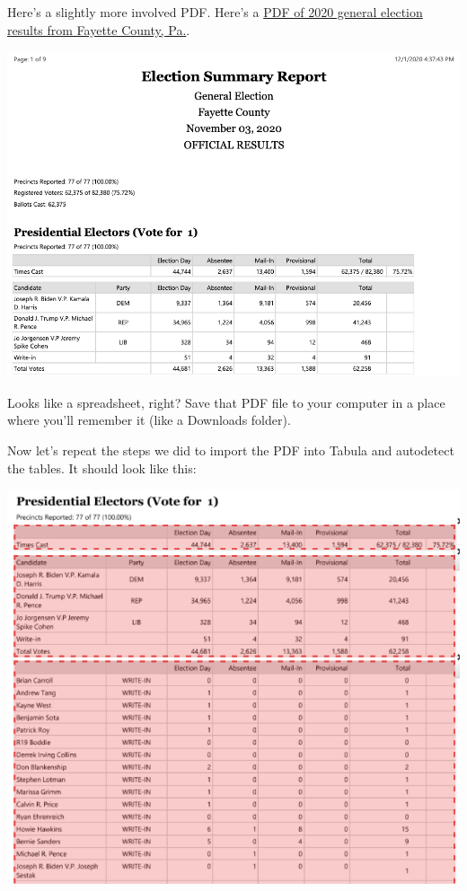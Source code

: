 \documentclass[
  letterpaper,
  DIV=11,
  numbers=noendperiod]{scrreprt}
\begin{document}
Here's a slightly more involved PDF. Here's a
\href{https://raw.githubusercontent.com/openelections/openelections-sources-pa/master/2020/general/Fayette\%20PA\%202020\%20General\%20Summary.pdf}{PDF
of 2020 general election results from Fayette County, Pa.}.

\includegraphics{./images/fayette_1.png}

Looks like a spreadsheet, right? Save that PDF file to your computer in
a place where you'll remember it (like a Downloads folder).

Now let's repeat the steps we did to import the PDF into Tabula and
autodetect the tables. It should look like this:

\includegraphics{./images/fayette_2.png}
\end{document}
